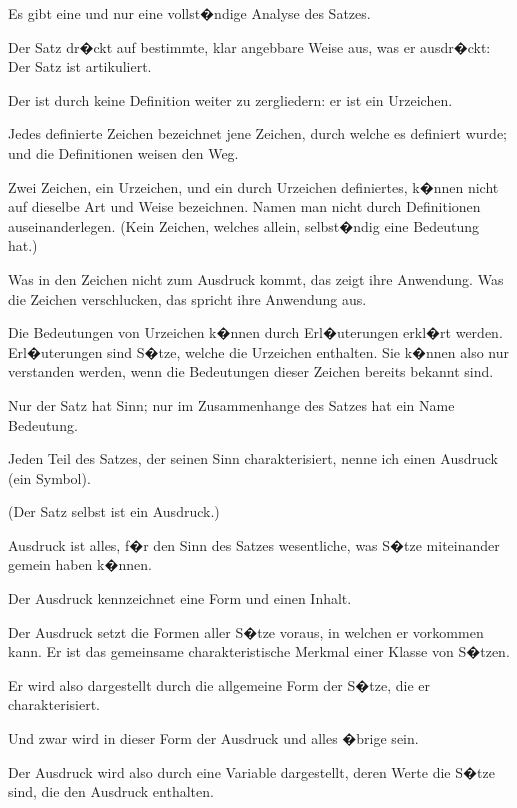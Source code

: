 \begin{propositions}
{Es gibt eine und nur eine vollst�ndige Analyse
des Satzes.}


{Der Satz dr�ckt auf bestimmte, klar angebbare
Weise aus, was er ausdr�ckt: Der Satz ist artikuliert.}


{Der  ist durch keine Definition weiter zu
zergliedern: er ist ein Urzeichen.}


{Jedes definierte Zeichen bezeichnet  jene
Zeichen, durch welche es definiert wurde; und die
Definitionen weisen den Weg.

Zwei Zeichen, ein Urzeichen, und ein durch
Urzeichen definiertes, k�nnen nicht auf dieselbe
Art und Weise bezeichnen. Namen  man
nicht durch Definitionen auseinanderlegen. (Kein
Zeichen, welches allein, selbst�ndig eine Bedeutung
hat.)}


{Was in den Zeichen nicht zum Ausdruck kommt,
das zeigt ihre Anwendung. Was die Zeichen
verschlucken, das spricht ihre Anwendung aus.}


{Die Bedeutungen von Urzeichen k�nnen durch
Erl�uterungen erkl�rt werden. Erl�uterungen
sind S�tze, welche die Urzeichen enthalten. Sie
k�nnen also nur verstanden werden, wenn die
Bedeutungen dieser Zeichen bereits bekannt sind.}


{Nur der Satz hat Sinn; nur im Zusammenhange
des Satzes hat ein Name Bedeutung.}


{Jeden Teil des Satzes, der seinen Sinn charakterisiert,
nenne ich einen Ausdruck (ein Symbol).

(Der Satz selbst ist ein Ausdruck.)

Ausdruck ist alles, f�r den Sinn des Satzes
wesentliche, was S�tze miteinander gemein haben
k�nnen.

Der Ausdruck kennzeichnet eine Form und
einen Inhalt.}


{Der Ausdruck setzt die Formen aller S�tze
voraus, in welchen er vorkommen kann. Er ist
das gemeinsame charakteristische Merkmal einer
Klasse von S�tzen.}


{Er wird also dargestellt durch die allgemeine
Form der S�tze, die er charakterisiert.

Und zwar wird in dieser Form der Ausdruck
 und alles �brige  sein.}


{Der Ausdruck wird also durch eine Variable
\enlargethispage{6pt} %
dargestellt, deren Werte die S�tze sind, die den
Ausdruck enthalten.

}
\end{propositions}
